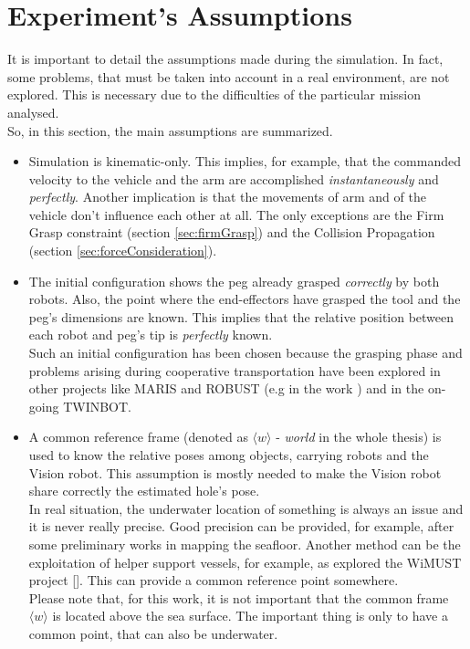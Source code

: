 \section{Experiment's Assumptions}
\label{sec:expAssumption}
It is important to detail the assumptions made during the simulation. In fact, some problems, that must be taken into account in a real environment, are not explored. This is necessary due to the difficulties of the particular mission analysed. \\
So, in this section, the main assumptions are summarized.

\begin{itemize}
	\item Simulation is kinematic-only. This implies, for example, that the commanded velocity to the vehicle and the arm are accomplished \textit{instantaneously} and \textit{perfectly}. Another implication is that the movements of arm and of the vehicle don't influence each other at all. The only exceptions are the Firm Grasp constraint (section \ref{sec:firmGrasp}) and the Collision Propagation (section \ref{sec:forceConsideration}).
	
	\item The initial configuration shows the peg already grasped \textit{correctly} by both robots. Also, the point where the end-effectors have grasped the tool and the peg's dimensions are known. This implies that the relative position between each robot and peg's tip is \textit{perfectly} known.\\
	Such an initial configuration has been chosen because the grasping phase and problems arising during cooperative transportation have been explored in other projects like MARIS and ROBUST (e.g in the work \cite{IntroMaris2}) and in the on-going TWINBOT.
	
	
	\item A common reference frame (denoted as $\langle w \rangle$ - \textit{world} in the whole thesis) is used to know the relative poses among objects, carrying robots and the Vision robot. This assumption is mostly needed to make the Vision robot share correctly the estimated hole's pose.\\
	In real situation, the underwater location of something is always an issue and it is never really precise. Good precision can be provided, for example, after some preliminary works in mapping the seafloor. Another method can be the exploitation of helper support vessels, for example, as explored the WiMUST project [\cite{wimust}]. This can provide a common reference point somewhere.\\
	Please note that, for this work, it is not important that the common frame $\langle w \rangle$ is located above the sea surface. The important thing is only to have a common point, that can also be underwater.\\


\end{itemize}
